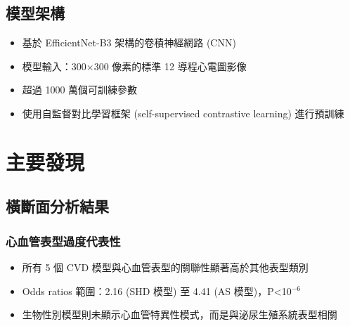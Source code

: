 \documentclass[12pt,a4paper]{article}
\begin{document}
\subsection{模型架構}

\begin{itemize}
    \item 基於 EfficientNet-B3 架構的卷積神經網路 (CNN)
    \item 模型輸入：300×300 像素的標準 12 導程心電圖影像
    \item 超過 1000 萬個可訓練參數
    \item 使用自監督對比學習框架 (self-supervised contrastive learning) 進行預訓練
\end{itemize}

\section{主要發現}


\subsection{橫斷面分析結果}

\subsubsection{心血管表型過度代表性}

\begin{itemize}
    \item 所有 5 個 CVD 模型與心血管表型的關聯性顯著高於其他表型類別
    \item Odds ratios 範圍：2.16 (SHD 模型) 至 4.41 (AS 模型)，P<10$^{-6}$
    \item 生物性別模型則未顯示心血管特異性模式，而是與泌尿生殖系統表型相關
\end{itemize}
\end{document}
